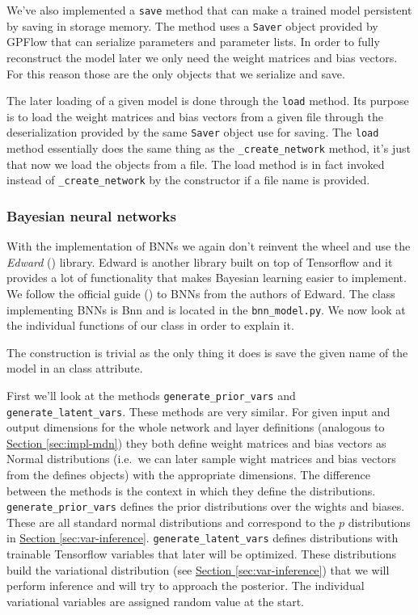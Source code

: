\documentclass[12pt,a4paper,twoside]{scrartcl}
\numberwithin{equation}{section}
\newcommand{\refsec}[1]{\hyperref[#1]{Section \ref*{#1}}}
\begin{document}
We've also implemented a \texttt{save} method that can make a trained model persistent by saving in storage memory. The method uses a \texttt{Saver} object provided by GPFlow that can serialize parameters and parameter lists. In order to fully reconstruct the model later we only need the weight matrices and bias vectors. For this reason those are the only objects that we serialize and save.

The later loading of a given model is done through the \texttt{load} method. Its purpose is to load the weight matrices and bias vectors from a given file through the deserialization provided by the same \texttt{Saver} object use for saving. The \texttt{load} method essentially does the same thing as the \texttt{\_create\_network} method, it's just that now we load the objects from a file. The load method is in fact invoked instead of \texttt{\_create\_network} by the constructor if a file name is provided.
\subsubsection{Bayesian neural networks}
\label{sec:impl-bnn}
With the implementation of BNNs we again don't reinvent the wheel and use the \emph{Edward} (\cite{edward}) library. Edward is another library built on top of Tensorflow and it provides a lot of functionality that makes Bayesian learning easier to implement. We follow the official guide (\cite{bnntut}) to BNNs from the authors of Edward. The class implementing BNNs is Bnn and is located in the \texttt{bnn\_model.py}. We now look at the individual functions of our class in order to explain it.

The construction is trivial as the only thing it does is save the given name of the model in an class attribute.

First we'll look at the methods \texttt{generate\_prior\_vars} and \texttt{generate\_latent\_vars}. These methods are very similar. For given input and output dimensions for the whole network and layer definitions (analogous to \refsec{sec:impl-mdn}) they both define weight matrices and bias vectors as Normal distributions (i.e.\ we can later sample wight matrices and bias vectors from the defines objects) with the appropriate dimensions. The difference between the methods is the context in which they define the distributions. \texttt{generate\_prior\_vars} defines the prior distributions over the wights and biases. These are all standard normal distributions and correspond to the \(p\) distributions in \refsec{sec:var-inference}. \texttt{generate\_latent\_vars} defines distributions with trainable Tensorflow variables that later will be optimized. These distributions build the variational distribution (see \refsec{sec:var-inference}) that we will perform inference and will try to approach the posterior. The individual variational variables are assigned random value at the start. 
\end{document}
